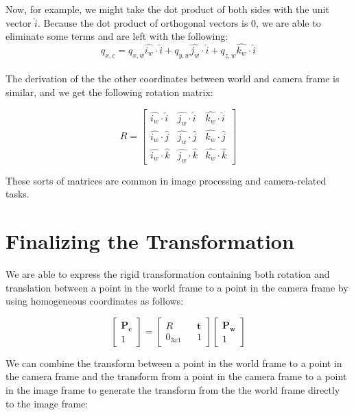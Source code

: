 \documentclass[]{article}
\begin{document}
Now, for example, we might take the dot product of both sides with the unit vector $\hat{i}$. Because the dot product of orthogonal vectors is 0, we are able to eliminate some terms and are left with the following:
\begin{equation}
q_{x,c} = q_{x,w}\hat{i_w} \cdot \hat{i} + q_{y,w}\hat{j_w} \cdot \hat{i} + q_{z,w}\hat{k_w} \cdot \hat{i}
\end{equation}\\
The derivation of the the other coordinates between world and camera frame is similar, and we get the following rotation matrix:

\begin{equation}
R =
\begin{bmatrix}
\hat{i_w} \cdot \hat{i} & \hat{j_w} \cdot \hat{i} & \hat{k_w} \cdot \hat{i} \\
\hat{i_w} \cdot \hat{j} & \hat{j_w} \cdot \hat{j} & \hat{k_w} \cdot \hat{j} \\
\hat{i_w} \cdot \hat{k} & \hat{j_w} \cdot \hat{k} & \hat{k_w} \cdot \hat{k}
\end{bmatrix}
\end{equation}

These sorts of matrices are common in image processing and camera-related tasks.

\section{Finalizing the Transformation}
We are able to express the rigid transformation containing both rotation and translation between a point in the world frame to a point in the camera frame by using homogeneous coordinates as follows:

\begin{equation}
\begin{bmatrix}
\boldsymbol{P_c} \\
1
\end{bmatrix}
=
\begin{bmatrix}
R && \boldsymbol{t} \\
0_{3x1} && 1
\end{bmatrix}
\begin{bmatrix}
\boldsymbol{P_w} \\ 1
\end{bmatrix}
\end{equation}

We can combine the transform between a point in the world frame to a point in the camera frame and the transform from a point in the camera frame to a point in the image frame to generate the transform from the the world frame directly to the image frame:
\end{document}
